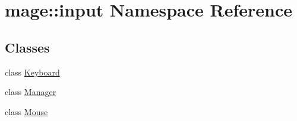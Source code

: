 \hypertarget{namespacemage_1_1input}{}\section{mage\+:\+:input Namespace Reference}
\label{namespacemage_1_1input}
\subsection*{Classes}
\begin{DoxyCompactItemize}
\item 
class \mbox{\hyperlink{classmage_1_1input_1_1_keyboard}{Keyboard}}
\item 
class \mbox{\hyperlink{classmage_1_1input_1_1_manager}{Manager}}
\item 
class \mbox{\hyperlink{classmage_1_1input_1_1_mouse}{Mouse}}
\end{DoxyCompactItemize}
